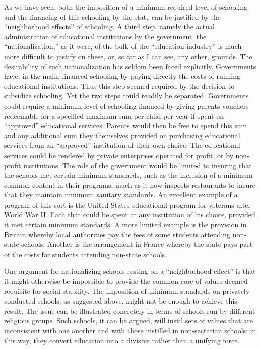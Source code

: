 \documentclass[11pt,openany]{book}
\begin{document}
As we have seen, both the imposition of a minimum required level of schooling and the financing of this schooling by the state can be justified by the ``neighborhood effects'' of schooling. A third step, namely the actual administration of educational institutions by the government, the ``nationalization,'' as it were, of the bulk of the ``education industry'' is much more difficult to justify on these, or, so far as I can see, any other, grounds. The desirability of such nationalization has seldom been faced explicitly. Governments have, in the main, financed schooling by paying directly the costs of running educational institutions. Thus this step seemed required by the decision to subsidize schooling. Yet the two steps could readily be separated. Governments could require a minimum level of schooling financed by giving parents vouchers redeemable for a specified maximum sum per child per year if spent on ``approved'' educational services. Parents would then be free to spend this sum and any additional sum they themselves provided on purchasing educational services from an ``approved'' institution of their own choice. The educational services could be rendered by private enterprises operated for profit, or by non-profit institutions. The role of the government would be limited to insuring that the schools met certain minimum standards, such as the inclusion of a minimum common content in their programs, much as it now inspects restaurants to insure that they maintain minimum sanitary standards. An excellent example of a program of this sort is the United States educational program for veterans after World War II. Each that could be spent at any institution of his choice, provided it met certain minimum standards. A more limited example is the provision in Britain whereby local authorities pay the fees of some students attending non-state schools. Another is the arrangement in France whereby the state pays part of the costs for students attending non-state schools.

One argument for nationalizing schools resting on a ``neighborhood effect'' is that it might otherwise be impossible to provide the common core of values deemed requisite for social stability. The imposition of minimum standards on privately conducted schools, as suggested above, might not be enough to achieve this result. The issue can be illustrated concretely in terms of schools run by different religious groups. Such schools, it can be argued, will instil sets of values that are inconsistent with one another and with those instilled in non-sectarian schools; in this way, they convert education into a divisive rather than a unifying force.
\end{document}
